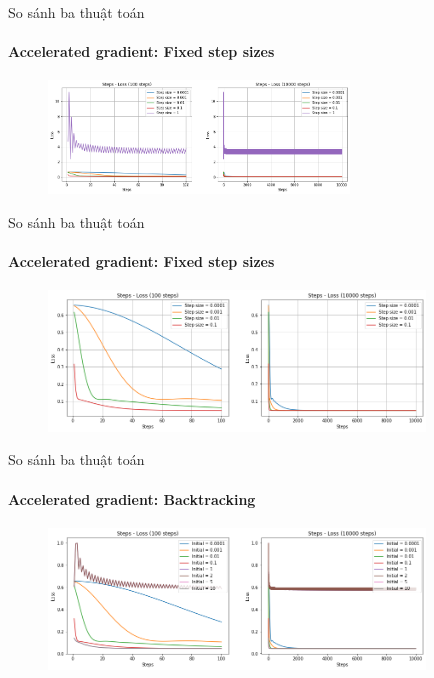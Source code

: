 \documentclass[10pt]{beamer}
\theoremstyle{remark}
\theoremstyle{definition}
\begin{document}
\begin{frame}{So sánh ba thuật toán}
	\framesubtitle{Accelerated gradient: Fixed step sizes}

	\begin{figure}
		\centering
		\includegraphics[width=8cm]{Thinh/16.png}
	\end{figure}

\end{frame}
\begin{frame}{So sánh ba thuật toán}
	\framesubtitle{Accelerated gradient: Fixed step sizes}

	\begin{figure}[!htp]
		\centering
		\includegraphics[width=10cm]{Thinh/17.png}
	\end{figure}

\end{frame}

\begin{frame}[allowframebreaks]{So sánh ba thuật toán}
	\framesubtitle{Accelerated gradient: Backtracking}
	\begin{figure}[!htp]
		\centering
		\includegraphics[width=10cm]{Thinh/18.png}
	\end{figure}
\end{frame}
\end{document}
